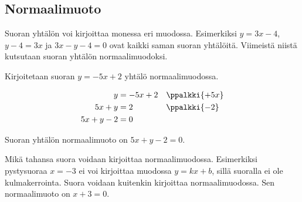 \subsection*{Normaalimuoto}

Suoran yhtälön voi kirjoittaa monessa eri muodossa. Esimerkiksi $y=3x-4$, $y-4=3x$ ja $3x-y-4=0$ ovat kaikki saman suoran yhtälöitä. Viimeistä niistä kutsutaan 
suoran yhtälön normaalimuodoksi.


\begin{esimerkki}
Kirjoitetaan suoran $y=-5x+2$ yhtälö normaalimuodossa.
\begin{esimratk}
\begin{align*}
y&=-5x+2 && \ppalkki{+5x} \\
5x+y&=2 && \ppalkki{-2} \\
5x+y-2&=0 &&
\end{align*}
\end{esimratk}
\begin{esimvast}
Suoran yhtälön normaalimuoto on $5x+y-2=0$.
\end{esimvast}
\end{esimerkki}


Mikä tahansa suora voidaan kirjoittaa normaalimuodossa. Esimerkiksi pystysuoraa $x=-3$ ei voi kirjoittaa muodossa $y=kx+b$, sillä suoralla ei ole kulmakerrointa. Suora voidaan kuitenkin kirjoittaa normaalimuodossa. Sen normaalimuoto on $x+3=0$.

